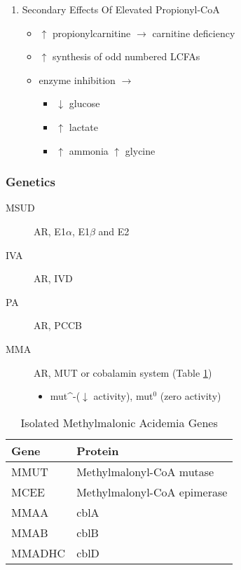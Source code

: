 \documentclass{scrartcl}
\begin{document}
\begin{enumerate}
\item Secondary Effects Of Elevated Propionyl-CoA
\label{sec:org7585dc9}
\begin{itemize}
\item \(\uparrow\) propionylcarnitine \(\to\) carnitine deficiency
\item \(\uparrow\) synthesis of odd numbered LCFAs
\item enzyme inhibition \(\to\)
\begin{itemize}
\item \(\downarrow\) glucose
\item \(\uparrow\) lactate
\item \(\uparrow\) ammonia
\(\uparrow\) glycine
\end{itemize}
\end{itemize}
\end{enumerate}

\subsubsection{Genetics}
\label{sec:org943b8ee}
\begin{description}
\item[{MSUD}] AR, E1\(\alpha\), E1\(\beta\) and E2
\item[{IVA}] AR, IVD
\item[{PA}] AR, PCCB
\item[{MMA}] AR, MUT or cobalamin system (Table \ref{tab:org2d75f27})
\begin{itemize}
\item mut\^{}-(\(\downarrow\) activity), mut\(^{\text{0}}\) (zero activity)
\end{itemize}
\end{description}

\begin{table}[htbp]
\caption{\label{tab:org2d75f27}
Isolated Methylmalonic Acidemia Genes}
\centering
\begin{tabular}{ll}
Gene\footnotemark & Protein\\
\hline
MMUT & Methylmalonyl-CoA mutase\\
MCEE & Methylmalonyl-CoA epimerase\\
MMAA & cblA\\
MMAB & cblB\\
MMADHC & cblD\\
\end{tabular}
\end{table}
\end{document}
